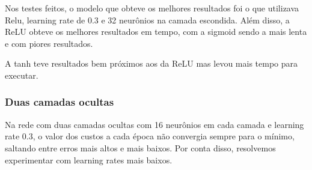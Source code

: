 \documentclass[conference]{IEEEtran}
\begin{document}
	Nos testes feitos, o modelo que obteve os melhores resultados foi o que utilizava Relu, learning rate de 0.3 e 32 neurônios na camada escondida. Além disso, a ReLU obteve os melhores resultados em tempo, com a sigmoid sendo a mais lenta e com piores resultados.
	
	A tanh teve resultados bem próximos aos da ReLU mas levou mais tempo para executar.

\subsubsection{Duas camadas ocultas}

	Na rede com duas camadas ocultas com 16 neurônios em cada camada e learning rate 0.3, o valor dos custos a cada época não convergia sempre para o mínimo, saltando entre erros mais altos e mais baixos. Por conta disso, resolvemos experimentar com learning rates mais baixos.
	
	
\begin{table}[h!]
 \begin{center}
  \caption{Testes de Performance para NN com 2 Camadas Ocultas}
  \label{table:table6}
 \end{center}
\end{table}
\end{document}
